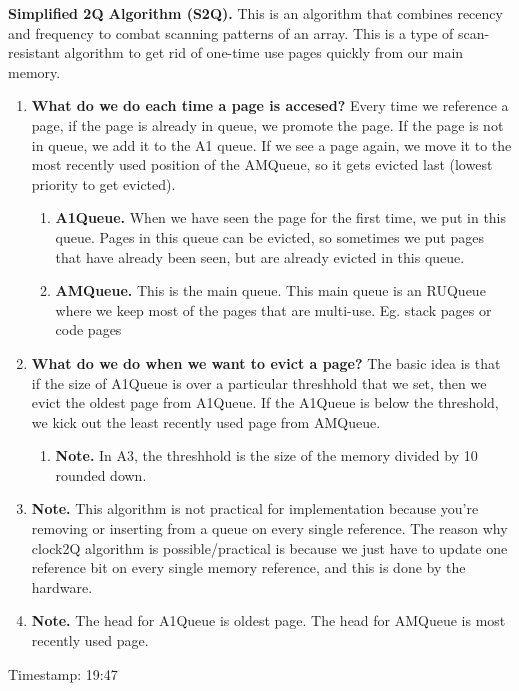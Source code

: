 \documentclass[12pt]{article}
\begin{document}
{\bf Simplified 2Q Algorithm (S2Q).} {This is an algorithm that combines recency and frequency to combat scanning patterns of an array. This is a type of scan-resistant algorithm to get rid of one-time use pages quickly from our main memory.}
    \begin{enumerate}
        \item[]{\bf What do we do each time a page is accesed?} {Every time we reference a page, if the page is already in queue, we promote the page. If the page is not in queue, we add it to the A1 queue. If we see a page again, we move it to the most recently used position of the AMQueue, so it gets evicted last (lowest priority to get evicted).}
        \begin{enumerate}
            \item[]{\bf A1Queue.} {When we have seen the page for the first time, we put in this queue. Pages in this queue can be evicted, so sometimes we put pages that have already been seen, but are already evicted in this queue.} 
            \item[]{\bf AMQueue.} {This is the main queue. This main queue is an RUQueue where we keep most of the pages that are multi-use. Eg. stack pages or code pages}
        \end{enumerate}
        \item[]{\bf What do we do when we want to evict a page?} The basic idea is that if the size of A1Queue is over a particular threshhold that we set, then we evict the oldest page from A1Queue. If the A1Queue is below the threshold, we kick out the least recently used page from AMQueue. 
        \begin{enumerate}
            \item[]{\bf Note.} {In A3, the threshhold is the size of the memory divided by 10 rounded down.}
        \end{enumerate}
        \item[]{\bf Note.} {This algorithm is not practical for implementation because you're removing or inserting from a queue on every single reference. The reason why clock2Q algorithm is possible/practical is because we just have to update one reference bit on every single memory reference, and this is done by the hardware.}
        \item[]{\bf Note.} {The head for A1Queue is oldest page. The head for AMQueue is most recently used page.}
    \end{enumerate}

Timestamp: 19:47
\end{document}
